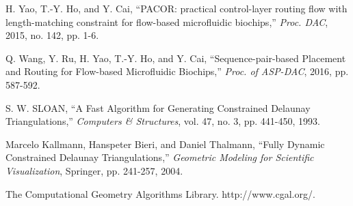 \documentclass[journal]{IEEEtran}
\begin{document}
\begin{thebibliography}{99}
{
H. Yao, T.-Y. Ho, and Y. Cai, 
``PACOR: practical control-layer routing flow with length-matching constraint for flow-based microfluidic biochips,'' 
{\em Proc. DAC},
2015, no. 142, pp. 1-6.

Q. Wang, Y. Ru, H. Yao, T.-Y. Ho, and Y. Cai,
``Sequence-pair-based Placement and Routing for Flow-based Microfluidic Biochips,''
{\em Proc. of ASP-DAC},
2016, pp. 587-592.


S. W. SLOAN, 
``A Fast Algorithm for Generating Constrained Delaunay Triangulations,''
{\em Computers \& Structures}, 
vol. 47, no. 3, pp. 441-450, 1993.

Marcelo Kallmann, Hanspeter Bieri, and Daniel Thalmann, 
``Fully Dynamic Constrained Delaunay Triangulations,''
{\em Geometric Modeling for Scientific Visualization}, 
Springer, pp. 241-257, 2004.

The Computational Geometry Algorithms Library. http://www.cgal.org/.







}
\end{thebibliography}
\end{document}
